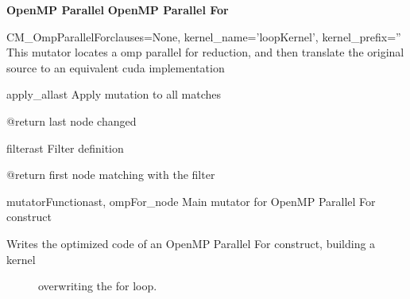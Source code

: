 \documentclass[a4paper,10pt,english]{manual}
\begin{document}
\textbf{OpenMP Parallel}
\hypertarget{module-Backends.CudaBackend.Mutators.CM_OmpParallel}{}
\modulesynopsis{}
\textbf{OpenMP Parallel For}
\hypertarget{module-Backends.CudaBackend.Mutators.CM_OmpParallelFor}{}
\modulesynopsis{}

\hypertarget{Backends.CudaBackend.Mutators.CM\_OmpParallelFor.CM\_OmpParallelFor}{}\begin{classdesc}{CM\_OmpParallelFor}{clauses=None, kernel\_name='loopKernel', kernel\_prefix=''}
This  mutator locates a omp parallel for reduction, and then
translate the original source to an equivalent cuda implementation

\hypertarget{Backends.CudaBackend.Mutators.CM\_OmpParallelFor.CM\_OmpParallelFor.apply\_all}{}\begin{methoddesc}{apply\_all}{ast}
Apply mutation to all matches

@return last node changed
\end{methoddesc}

\hypertarget{Backends.CudaBackend.Mutators.CM\_OmpParallelFor.CM\_OmpParallelFor.filter}{}\begin{methoddesc}{filter}{ast}
Filter definition

@return first node matching with the filter
\end{methoddesc}

\hypertarget{Backends.CudaBackend.Mutators.CM\_OmpParallelFor.CM\_OmpParallelFor.mutatorFunction}{}\begin{methoddesc}{mutatorFunction}{ast, ompFor\_node}
Main mutator for OpenMP Parallel For construct
\begin{description}
\item[Writes the optimized code of an OpenMP Parallel For construct, building a kernel] \leavevmode
overwriting the for loop.

\end{description}
\end{methoddesc}
\end{classdesc}
\end{document}
